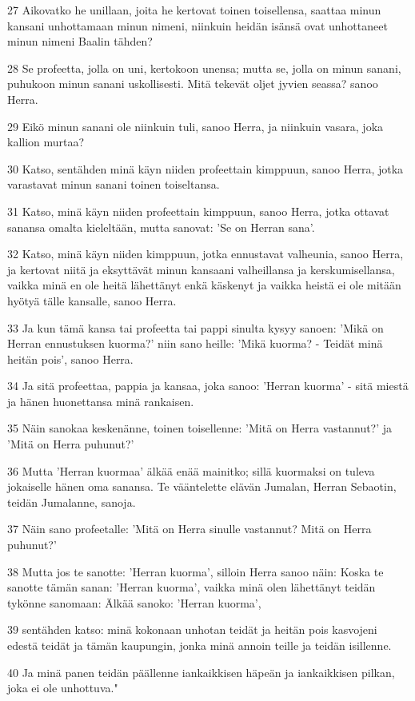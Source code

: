\par 27 Aikovatko he unillaan, joita he kertovat toinen toisellensa, saattaa minun kansani unhottamaan minun nimeni, niinkuin heidän isänsä ovat unhottaneet minun nimeni Baalin tähden?
\par 28 Se profeetta, jolla on uni, kertokoon unensa; mutta se, jolla on minun sanani, puhukoon minun sanani uskollisesti. Mitä tekevät oljet jyvien seassa? sanoo Herra.
\par 29 Eikö minun sanani ole niinkuin tuli, sanoo Herra, ja niinkuin vasara, joka kallion murtaa?
\par 30 Katso, sentähden minä käyn niiden profeettain kimppuun, sanoo Herra, jotka varastavat minun sanani toinen toiseltansa.
\par 31 Katso, minä käyn niiden profeettain kimppuun, sanoo Herra, jotka ottavat sanansa omalta kieleltään, mutta sanovat: 'Se on Herran sana'.
\par 32 Katso, minä käyn niiden kimppuun, jotka ennustavat valheunia, sanoo Herra, ja kertovat niitä ja eksyttävät minun kansaani valheillansa ja kerskumisellansa, vaikka minä en ole heitä lähettänyt enkä käskenyt ja vaikka heistä ei ole mitään hyötyä tälle kansalle, sanoo Herra.
\par 33 Ja kun tämä kansa tai profeetta tai pappi sinulta kysyy sanoen: 'Mikä on Herran ennustuksen kuorma?' niin sano heille: 'Mikä kuorma? - Teidät minä heitän pois', sanoo Herra.
\par 34 Ja sitä profeettaa, pappia ja kansaa, joka sanoo: 'Herran kuorma' - sitä miestä ja hänen huonettansa minä rankaisen.
\par 35 Näin sanokaa keskenänne, toinen toisellenne: 'Mitä on Herra vastannut?' ja 'Mitä on Herra puhunut?'
\par 36 Mutta 'Herran kuormaa' älkää enää mainitko; sillä kuormaksi on tuleva jokaiselle hänen oma sanansa. Te vääntelette elävän Jumalan, Herran Sebaotin, teidän Jumalanne, sanoja.
\par 37 Näin sano profeetalle: 'Mitä on Herra sinulle vastannut? Mitä on Herra puhunut?'
\par 38 Mutta jos te sanotte: 'Herran kuorma', silloin Herra sanoo näin: Koska te sanotte tämän sanan: 'Herran kuorma', vaikka minä olen lähettänyt teidän tykönne sanomaan: Älkää sanoko: 'Herran kuorma',
\par 39 sentähden katso: minä kokonaan unhotan teidät ja heitän pois kasvojeni edestä teidät ja tämän kaupungin, jonka minä annoin teille ja teidän isillenne.
\par 40 Ja minä panen teidän päällenne iankaikkisen häpeän ja iankaikkisen pilkan, joka ei ole unhottuva."

